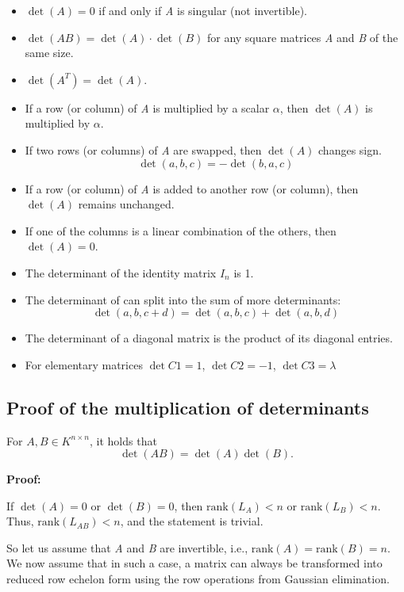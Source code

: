 \begin{itemize}
    \item \(\det(A) = 0\) if and only if \emph{A} is singular (not invertible).
    \item \(\det(AB) = \det(A) \cdot \det(B)\) for any square matrices \emph{A} and \emph{B} of the same size.
    \item \(\det(A^T) = \det(A)\).
    \item If a row (or column) of \emph{A} is multiplied by a scalar \(\alpha\), 
    then \(\det(A)\) is multiplied by \(\alpha\).
    \item If two rows (or columns) of \emph{A} are swapped, then \(\det(A)\) changes sign.
    \[\det(a,b,c) = - \det(b,a,c)\]
    \item If a row (or column) of \emph{A} is added to another row (or column), then \(\det(A)\) remains unchanged.
    \item If one of the columns is a linear combination of the others, then \(\det(A) = 0\).
    \item The determinant of the identity matrix \(I_n\) is 1.
    \item The determinant of can split into the sum of more determinants:
    \[
    \det(a,b,c + d) = \det(a,b,c) + \det(a,b,d)
    \]
    \item The determinant of a diagonal matrix is the product of its diagonal entries.
    \item For elementary matrices \(\det C1 = 1\), \(\det C2 = -1\), \(\det C3 = \lambda\)
\end{itemize}

\subsection{Proof of the multiplication of determinants}

For \( A, B \in K^{n \times n} \), it holds that
\[
\det(AB) = \det(A)\det(B).
\]

\textbf{Proof:}

If \( \det(A) = 0 \) or \( \det(B) = 0 \), 
then \( \text{rank}(L_A) < n \) or \( \text{rank}(L_B) < n \). \\
Thus, \( \text{rank}(L_{AB}) < n \), 
and the statement is trivial.

So let us assume that \emph{A} and \emph{B} are 
invertible, i.e., \( \text{rank}(A) = \text{rank}(B) = n \). \\
We now assume that in such a case, a matrix can 
always be transformed into reduced row 
echelon form using the row operations 
from Gaussian elimination.

